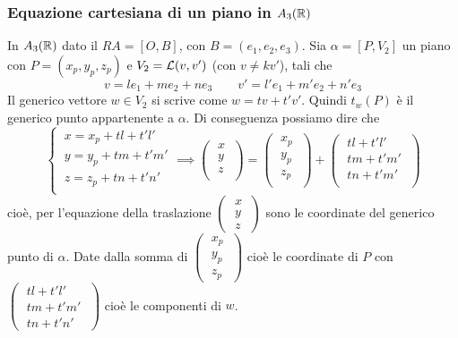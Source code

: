 \begin{figure}[ht]
    \centering
    \def\svgwidth{160pt}
    \label{fig:simmetria-punto-retta}
\end{figure}

\subsubsection{Equazione cartesiana di un piano in \(A_3(\RR )\)}
In \(A_3(\RR )\) dato il \(RA = [O, B]\), con \(B = (e_1, e_2, e_3)\). Sia \(\alpha = [P, V_2]\) un piano con \(P = (x_p, y_p, z_p)\) e \(V_2 = \mathcal{L}(v, v') \) (con \(v \neq kv'\)), tali che  \[
v = le_1 + me_2 + ne_3 \qquad 
v' = l'e_1 + m'e_2 + n'e_3
\] 
Il generico vettore \(w \in V_2\) si scrive come \(w = tv + t' v'\). Quindi \(t_w(P)\) è il generico punto appartenente a \(\alpha \). Di conseguenza possiamo dire che \[
\begin{cases}
    \ x = x_p + tl + t'l' \\
    \ y = y_p + tm + t'm' \\
    \ z = z_p + tn + t'n' \\
\end{cases} \implies 
\left( \;
 \begin{matrix}
    x \\
    y \\
    z \\
\end{matrix} \;
 \right) =
\left( \;
 \begin{matrix}
    x_p \\
    y_p \\
    z_p \\
\end{matrix} \;
 \right) +
\left( \;
 \begin{matrix}
    tl + t'l' \\
    tm + t'm' \\
    tn + t'm' \\
\end{matrix} \;
 \right) 
\] cioè, per l'equazione della traslazione \(\left( \; \begin{matrix} x \\ y\\ z \end{matrix} \; \right) \) sono le coordinate del generico punto di \(\alpha \). Date dalla somma di \(\left( \; \begin{matrix} x_p \\ y_p\\ z_p \end{matrix} \; \right) \) cioè le coordinate di \(P\) con \(\left( \; \begin{matrix} tl + t'l' \\ tm + t'm'\\ tn + t'n' \end{matrix} \; \right) \) cioè le componenti di \(w\).

